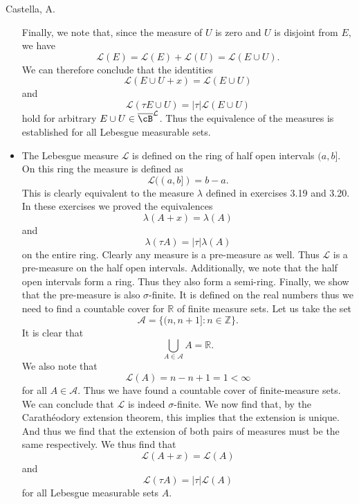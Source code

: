\begin{solution}[4.10]{Castella, A.}
\begin{itemize}
$$        $$
        Finally, we note that, since the measure of $U$ is zero and $U$ is disjoint from $E$, we have
        $$
            \mathcal{L}(E) = \mathcal{L}(E) + \mathcal{L}(U) = \mathcal{L}(E \cup U).
        $$
        We can therefore conclude that the identities
        $$
            \mathcal{L}(E\cup U + x) = \mathcal{L}(E\cup U)
        $$
        and
        $$
            \mathcal{L}(\tau E\cup U) = |\tau|\mathcal{L}(E\cup U)
        $$
        hold for arbitrary $E \cup U \in \overline{\cB}^\mathcal{L}$. Thus the equivalence of the measures is established for all Lebesgue measurable sets.
        \item The Lebesgue measure $\mathcal{L}$ is defined on the ring of half open intervals $(a, b]$. On this ring the measure is defined as
        $$
            \mathcal{L}((a,b]) = b - a.
        $$
        This is clearly equivalent to the measure $\lambda$ defined in exercises 3.19 and 3.20. In these exercises we proved the equivalences
        $$
            \lambda(A + x) = \lambda(A)
        $$
        and
        $$
            \lambda(\tau A) = |\tau|\lambda(A)
        $$
        on the entire ring. Clearly any measure is a pre-measure as well. Thus $\mathcal{L}$ is a pre-measure on the half open intervals. Additionally, we note that the half open intervals form a ring. Thus they also form a semi-ring. Finally, we show that the pre-measure is also $\sigma$-finite. It is defined on the real numbers thus we need to find a countable cover for $\mathbb{R}$ of finite measure sets. Let us take the set
        $$
            \mathcal{A} = \{(n, n+1] : n\in \mathbb{Z}\}.
        $$
        It is clear that
        $$
            \bigcup_{A \in \mathcal{A}}A = \mathbb{R}.
        $$
        We also note that
        $$
            \mathcal{L}(A) = n - n+1 = 1 < \infty
        $$
        for all $A \in \mathcal{A}$. Thus we have found a countable cover of finite-measure sets. We can conclude that $\mathcal{L}$ is indeed $\sigma$-finite. We now find that, by the Carath\'{e}odory extension theorem, this implies that the extension is unique. And thus we find that the extension of both pairs of measures must be the same respectively. We thus find that
        $$
            \mathcal{L}(A + x) = \mathcal{L}(A)
        $$
        and
        $$
            \mathcal{L}(\tau A) = |\tau|\mathcal{L}(A)
        $$
        for all Lebesgue measurable sets $A$.
    \end{itemize}
\end{solution}